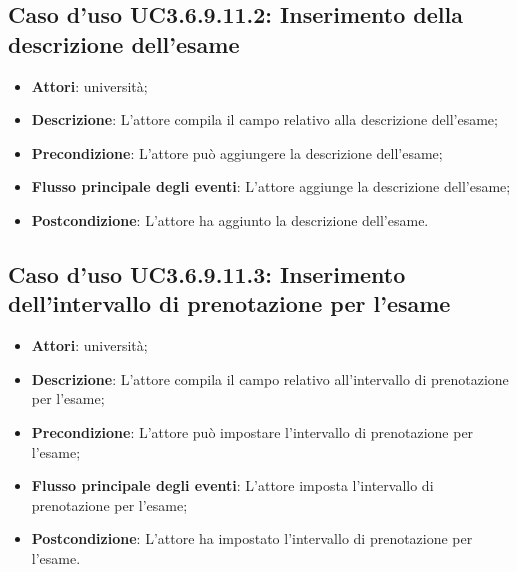 \subsection{Caso d'uso \texorpdfstring{UC3.6.9.11.2}{UC3.6.9.11.2}: Inserimento della descrizione dell’esame}
\begin{itemize}
\item \textbf{Attori}: università;
\item \textbf{Descrizione}: L'attore compila il campo relativo alla descrizione dell’esame;

\item \textbf{Precondizione}: L'attore può aggiungere la descrizione dell’esame;

\item \textbf{Flusso principale degli eventi}: L'attore aggiunge la descrizione dell’esame;

\item \textbf{Postcondizione}: L'attore ha aggiunto la descrizione dell’esame.

\end{itemize}
\subsection{Caso d'uso \texorpdfstring{UC3.6.9.11.3}{UC3.6.9.11.3}: Inserimento dell’intervallo di prenotazione per l’esame}
\begin{itemize}
\item \textbf{Attori}: università;
\item \textbf{Descrizione}: L'attore compila il campo relativo all'intervallo di prenotazione per l'esame;

\item \textbf{Precondizione}: L'attore può impostare l'intervallo di prenotazione per l’esame;

\item \textbf{Flusso principale degli eventi}: L'attore imposta l'intervallo di prenotazione per l'esame;

\item \textbf{Postcondizione}: L'attore ha impostato l'intervallo di prenotazione per l'esame.

\end{itemize}
